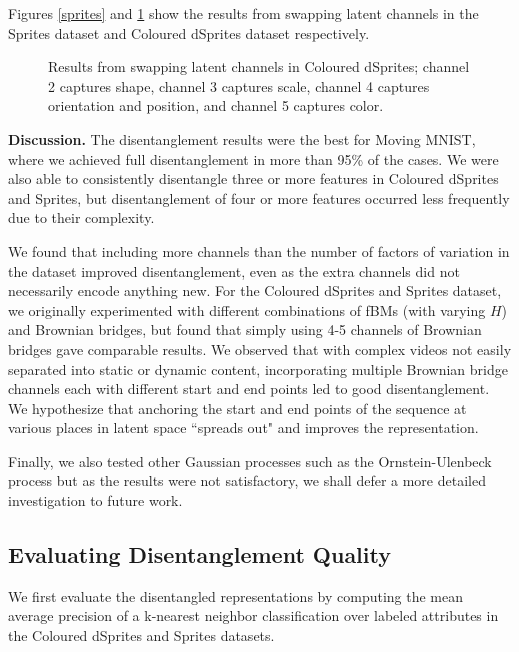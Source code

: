 \documentclass[runningheads]{llncs}
\begin{document}
   
   Figures \ref{sprites} and \ref{cdsprites} show the results from swapping latent channels in the Sprites dataset and Coloured dSprites dataset respectively. \par 
         
	   \begin{figure} [H]
   \centering  
   \caption{Results from swapping latent channels in Coloured dSprites; channel 2 captures shape, channel 3 captures scale, channel 4 captures orientation and position, and channel 5 captures color.}
   \label{cdsprites}
   \end{figure}

   \noindent \textbf{Discussion. }
   The disentanglement results were the best for Moving MNIST, where we achieved full disentanglement in more than 95\% of the cases. We were also able to consistently disentangle three or more features in Coloured dSprites and Sprites, but disentanglement of four or more features occurred less frequently due to their complexity. \par 
   
   We found that including more channels than the number of factors of variation in the dataset improved disentanglement, even as the extra channels did not necessarily encode anything new. For the Coloured dSprites and Sprites dataset, we originally experimented with different combinations of fBMs (with varying $H$) and Brownian bridges, but found that simply using 4-5 channels of Brownian bridges gave comparable results. We observed that with complex videos not easily separated into static or dynamic content, incorporating multiple Brownian bridge channels each with different start and end points led to good disentanglement. We hypothesize that anchoring the start and end points of the sequence at various places in latent space ``spreads out" and improves the representation. \par 

   Finally, we also tested other Gaussian processes such as the Ornstein-Ulenbeck process \cite{OUProcess} but as the results were not satisfactory, we shall defer a more detailed investigation to future work. \par 

   \subsection{Evaluating Disentanglement Quality}
   We first evaluate the disentangled representations by computing the mean average precision of a k-nearest neighbor classification over labeled attributes in the Coloured dSprites and Sprites datasets. 
\end{document}
